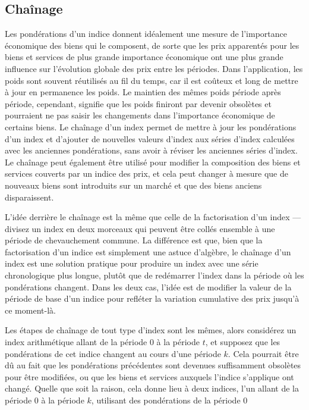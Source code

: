 \documentclass[]{article}
\begin{document}
\hypertarget{chauxeenage}{%
\subsection{Chaînage}\label{chauxeenage}}

Les pondérations d'un indice donnent idéalement une mesure de l'importance économique des biens qui le composent, de sorte que les prix apparentés pour les biens et services de plus grande importance économique ont une plus grande influence sur l'évolution globale des prix entre les périodes. Dans l'application, les poids sont souvent réutilisés au fil du temps, car il est coûteux et long de mettre à jour en permanence les poids. Le maintien des mêmes poids période après période, cependant, signifie que les poids finiront par devenir obsolètes et pourraient ne pas saisir les changements dans l'importance économique de certains biens. Le chaînage d'un index permet de mettre à jour les pondérations d'un index et d'ajouter de nouvelles valeurs d'index aux séries d'index calculées avec les anciennes pondérations, sans avoir à réviser les anciennes séries d'index. Le chaînage peut également être utilisé pour modifier la composition des biens et services couverts par un indice des prix, et cela peut changer à mesure que de nouveaux biens sont introduits sur un marché et que des biens anciens disparaissent.

L'idée derrière le chaînage est la même que celle de la factorisation d'un index --- divisez un index en deux morceaux qui peuvent être collés ensemble à une période de chevauchement commune. La différence est que, bien que la factorisation d'un indice est simplement une astuce d'algèbre, le chaînage d'un index est une solution pratique pour produire un index avec une série chronologique plus longue, plutôt que de redémarrer l'index dans la période où les pondérations changent. Dans les deux cas, l'idée est de modifier la valeur de la période de base d'un indice pour refléter la variation cumulative des prix jusqu'à ce moment-là.

Les étapes de chaînage de tout type d'index sont les mêmes, alors considérez un index arithmétique allant de la période 0 à la période \(t\), et supposez que les pondérations de cet indice changent au cours d'une période \(k\). Cela pourrait être dû au fait que les pondérations précédentes sont devenues suffisamment obsolètes pour être modifiées, ou que les biens et services auxquels l'indice s'applique ont changé. Quelle que soit la raison, cela donne lieu à deux indices, l'un allant de la période 0 à la période \(k\), utilisant des pondérations de la période 0
\end{document}
